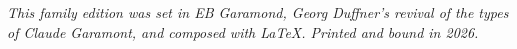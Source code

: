 \cleartoverso
\thispagestyle{empty}
\vspace*{\fill}
\begin{center}\footnotesize
{}\par\vspace{0.8\onelineskip}
\begin{minipage}{0.7\textwidth}\centering\itshape
This family edition was set in EB Garamond, Georg Duffner’s revival of the types of Claude Garamont, and composed with \LaTeX. Printed and bound in 2026.
\end{minipage}
\end{center}
\vspace*{\fill}

